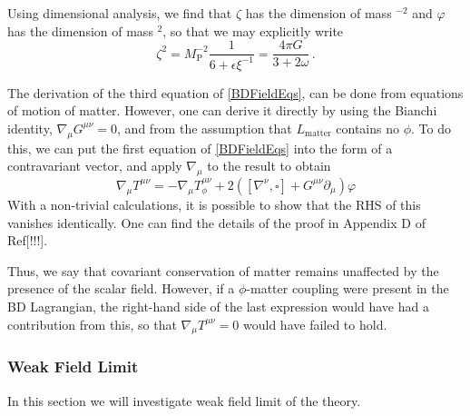 \documentclass[12pt]{article}
\begin{document}
Using dimensional analysis, we find that $\zeta$ has the dimension of mass ${ }^{-2}$ and $\varphi$ has the dimension of mass ${ }^{2}$, so that we may explicitly write
\begin{equation}
\zeta^{2}=M_{\mathrm{P}}^{-2} \frac{1}{6+\epsilon \xi^{-1}}=\frac{4 \pi G}{3+2 \omega} \,.
\end{equation}


The derivation of the third equation of \eqref{BDFieldEqs}, can be done from equations of motion of matter. 
However, one can derive it directly by using the Bianchi identity, $\nabla_{\mu} G^{\mu \nu}=0$, and from the assumption that $L_{\text{matter}}$ contains no $\phi$. 
To do this, we can put the first equation of \eqref{BDFieldEqs} into the form of a contravariant vector, and apply $\nabla_{\mu}$ to the result to obtain
\begin{equation}
\nabla_{\mu} T^{\mu \nu}=-\nabla_{\mu} T_{\phi}^{\mu \nu}+2\left(\left[\nabla^{\nu}, \square\right]+G^{\mu \nu} \partial_{\mu}\right) \varphi
\end{equation}
With a non-trivial calculations, it is possible to show that the RHS of this vanishes identically. One can find the details of the proof in Appendix D of Ref[!!!].

Thus, we say that covariant conservation of matter remains unaffected by the presence of the scalar field. However, if a $\phi$-matter coupling were present in the BD Lagrangian, the right-hand side of the last expression would have had a contribution from this, so that $\nabla_\mu T^{\mu \nu}=0$ would have failed to hold.

\subsubsection{Weak Field Limit}

In this section we will investigate weak field limit of the theory.
\end{document}
